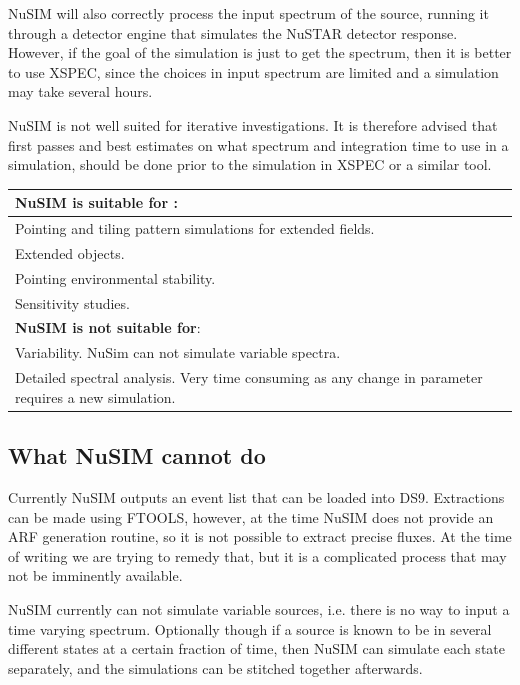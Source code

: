 NuSIM will also correctly process the input spectrum of the source, running it through a detector engine that simulates the NuSTAR detector response. However, if the goal of the simulation is just to get the spectrum, then it is better to use XSPEC, since the choices in input spectrum are limited and a simulation may take several hours. 

NuSIM is not well suited for iterative investigations. It is therefore advised that first passes and best estimates on what spectrum and integration time to use in a simulation, should be done prior to the simulation in XSPEC or a similar tool.


\begin{center}
\begin{tabular}{|p{9cm}|}
\hline
\hline \textbf{NuSIM is suitable for} : \\ 
\hline  
\hline
Pointing and tiling pattern simulations for extended fields. \\
\hline
Extended objects. \\
\hline
Pointing environmental stability. \\
\hline
Sensitivity studies.\\
\hline
\hline \textbf{NuSIM is not suitable for}: \\
\hline
\hline
Variability. NuSim can not simulate variable spectra. \\
\hline
Detailed spectral analysis. Very time consuming as any change in parameter requires a new simulation.\\
\hline
\end{tabular} 
\end{center}

\subsection{What NuSIM cannot do}
Currently NuSIM outputs an event list that can be loaded into DS9. Extractions can be made using FTOOLS, however, at the time NuSIM does not provide an ARF generation routine, so it is not possible to extract precise fluxes. At the time of writing we are trying to remedy that, but it is a complicated process that may not be imminently available.

NuSIM currently can not simulate variable sources, i.e. there is no way to input a time varying spectrum. Optionally though if a source is known to be in several different states at a certain fraction of time, then NuSIM can simulate each state separately, and the simulations can be stitched together afterwards.

